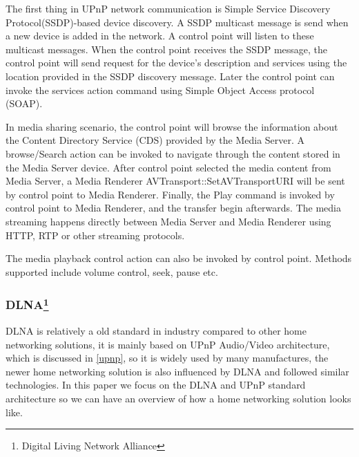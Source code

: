 The first thing in UPnP network communication is Simple Service Discovery
Protocol(SSDP)-based device discovery. A SSDP multicast message is send when a
new device is added in the network. A control point will listen to these
multicast messages. When the control point receives the SSDP message, the
control point will send request for the device's description and services using
the location provided in the SSDP discovery message. Later the control point can
invoke the services action command using Simple Object Access protocol (SOAP).

In media sharing scenario, the control point will browse the information about
the Content Directory Service (CDS) provided by the Media Server. A
browse/Search action can be invoked to navigate through the content stored in
the Media Server device. After control point selected the media content from
Media Server, a Media Renderer AVTransport::SetAVTransportURI will be sent by
control point to Media Renderer. Finally, the Play command is invoked by
control point to Media Renderer, and the transfer begin afterwards. The media
streaming happens directly between Media Server and Media Renderer using HTTP,
RTP or other streaming protocols.

The media playback control action can also be invoked by control point. Methods
supported include volume control, seek, pause etc.

\subsubsection[DLNA]{DLNA\footnote{Digital Living Network Alliance}}
DLNA is relatively a old standard in industry compared to other home networking
solutions, it is mainly based on UPnP Audio/Video architecture, which is
discussed in \ref{upnp}, so it is widely used by many manufactures, the newer
home networking solution is also influenced by DLNA and followed similar
technologies. In this paper we focus on the DLNA and UPnP standard architecture
so we can have an overview of how a home networking solution looks like.


